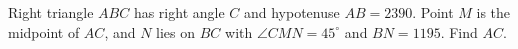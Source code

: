 Right triangle $ABC$ has right angle $C$ and hypotenuse $AB=2390$. Point $M$ is the midpoint of $AC$, and $N$ lies on $BC$ with $\angle CMN=45^\circ$ and $BN=1195$. Find $AC$.
